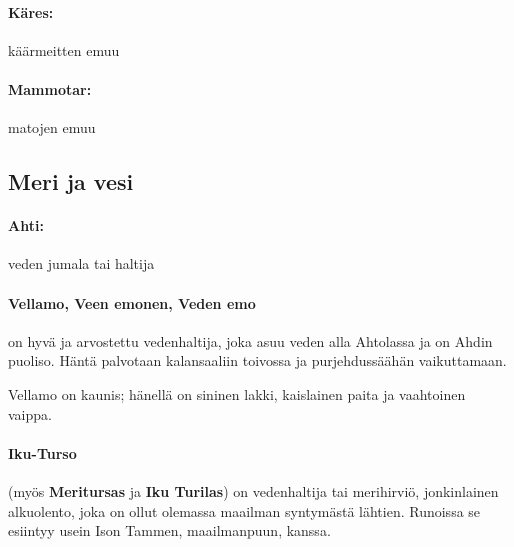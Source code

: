     \paragraph{Käres:} käärmeitten emuu
    \paragraph{Mammotar:} matojen emuu


\subsection{Meri ja vesi}

  \paragraph{Ahti:} veden jumala tai haltija
  \paragraph{Vellamo, Veen emonen, Veden emo} on hyvä ja arvostettu vedenhaltija, joka asuu veden
    alla Ahtolassa ja on Ahdin puoliso. Häntä palvotaan kalansaaliin toivossa ja purjehdussäähän
    vaikuttamaan.
    \par
    Vellamo on kaunis; hänellä on sininen lakki, kaislainen paita ja vaahtoinen vaippa.
  \paragraph{Iku-Turso} (myös \textbf{Meritursas} ja \textbf{Iku Turilas}) on vedenhaltija tai
    merihirviö, jonkinlainen alkuolento, joka on ollut olemassa maailman syntymästä lähtien.
    Runoissa se esiintyy usein Ison Tammen, maailmanpuun, kanssa.
